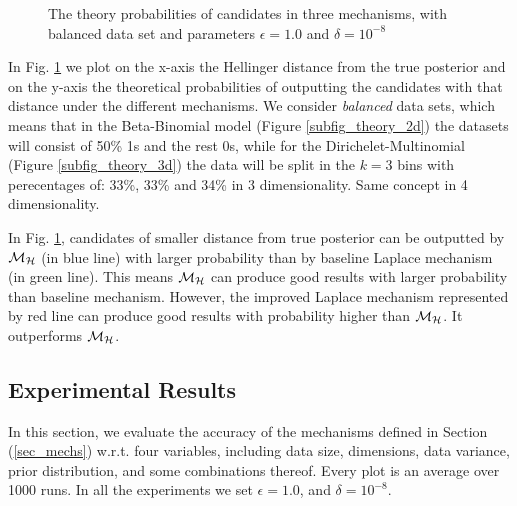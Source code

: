 \documentclass{article}
\begin{document}
\begin{figure}
\begin{center}
\centering
\caption{The theory probabilities of candidates in three mechanisms, with balanced data set and parameters $\epsilon = 1.0$ and $\delta = 10^{-8}$ }
\label{fig_theory}
\end{center}
\end{figure}
In Fig. \ref{fig_theory} we plot on the x-axis the Hellinger distance from the true posterior and on the y-axis the theoretical probabilities of outputting the candidates with that distance under the different mechanisms. We consider \emph{balanced} data sets, which means that in the Beta-Binomial model (Figure \ref{subfig_theory_2d}) the datasets will consist of 50\% 1s and the rest 0s, while for the
Dirichelet-Multinomial (Figure  \ref{subfig_theory_3d})
the data will be split in the $k=3$ bins with perecentages of: 33\%, 33\% and 34\% in 3 dimensionality. Same concept in 4 dimensionality.

In Fig. \ref{fig_theory}, candidates of smaller distance from true posterior can be outputted by $\mathcal{M}_{\mathcal{H}}$ (in blue line) with larger probability than by baseline Laplace mechanism (in green line). This means $\mathcal{M}_{\mathcal{H}}$ can produce good results with larger probability than baseline mechanism. However, the improved Laplace mechanism represented by red line can produce good results with probability higher than $\mathcal{M}_{\mathcal{H}}$. It outperforms $\mathcal{M}_{\mathcal{H}}$.


\subsection{Experimental Results}
\label{subsec_vs_variables}

In this section, we evaluate the accuracy of the mechanisms defined in
Section (\ref{sec_mechs}) w.r.t. four variables, including data size, dimensions,
data variance, prior distribution, and some combinations thereof.
Every plot is an average over 1000 runs. In all the experiments we set
$\epsilon = 1.0$, and $\delta = 10^{-8}$.
\end{document}

